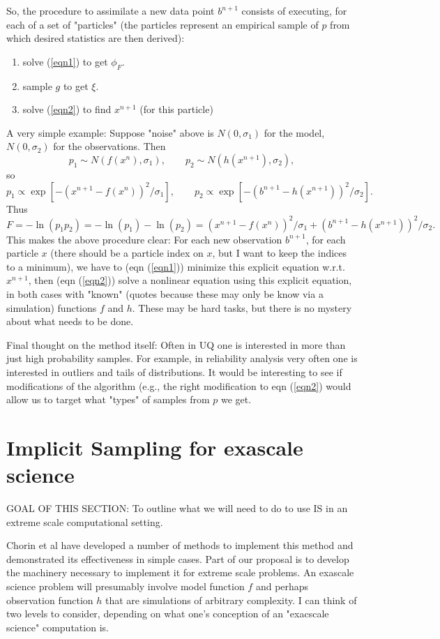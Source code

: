 \documentclass[11pt]{article}
\begin{document}
So, the procedure to assimilate a new data point $b^{n+1}$ consists of executing, for each of a set of "particles" (the particles represent an
empirical sample of $p$ from which desired statistics are then derived):
\begin{enumerate}
\item{solve (\ref{eqn1}) to get $\phi_F$.}
\item{sample $g$ to get $\xi$.}
\item{solve (\ref{eqn2}) to find $x^{n+1}$ (for this particle)}
\end{enumerate}

A very simple example:  Suppose "noise" above is $N(0,\sigma_1)$ for the model, $N(0, \sigma_2)$ for the observations.
Then 
$$p_1 \sim N(f(x^n), \sigma_1), \qquad p_2 \sim N(h(x^{n+1}), \sigma_2),$$
so
$$p_1 \propto \exp[-(x^{n+1} - f(x^n))^2 / \sigma_1], \qquad p_2 \propto \exp[-(b^{n+1} - h(x^{n+1}))^2 / \sigma_2].$$
Thus
$$ F = -\ln(p_1 p_2) = -\ln(p_1) - \ln(p_2) = (x^{n+1} - f(x^n))^2 / \sigma_1 + (b^{n+1} - h(x^{n+1}))^2 / \sigma_2.$$
This makes the above procedure clear: For each new observation $b^{n+1}$, for each particle $x$ (there should be a particle index on $x$, but I
want to keep the indices to a minimum), we have to (eqn (\ref{eqn1})) minimize this explicit equation w.r.t. $x^{n+1}$, 
then (eqn  (\ref{eqn2})) solve a nonlinear equation using this explicit equation, in both cases with 
"known" (quotes because these may only be know via a simulation) functions $f$ and $h$.  These may be hard tasks, but there is no
mystery about what needs to be done.

Final thought on the method itself:  Often in UQ one is interested in more than just high probability samples.  For example,
in reliability analysis very often one is interested in  outliers and tails of distributions.  It would be interesting to see
if modifications of the algorithm (e.g., the right modification to eqn (\ref{eqn2}) would allow us to target what "types" of 
samples from $p$ we get.

\section{Implicit Sampling for exascale science}
GOAL OF THIS SECTION: To outline what we will need to do to use IS in an extreme scale computational setting. 

Chorin et al have developed a number of methods to implement this method and demonstrated its effectiveness in simple cases.  Part of 
our proposal is to develop the machinery necessary to implement it for extreme scale problems.
An exascale science problem will presumably involve model function $f$ and perhaps observation function $h$ that are simulations of 
arbitrary complexity.  I can think of two levels to consider, depending on what one's conception of an "exacscale science" computation is. 
\end{document}

